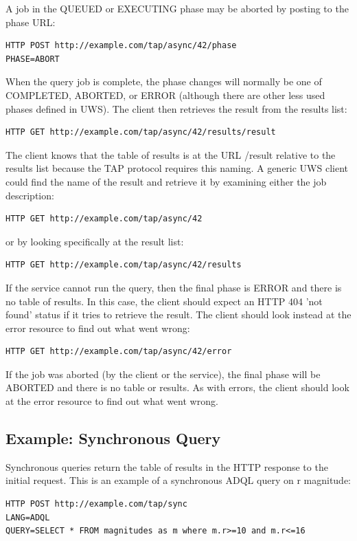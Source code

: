 \documentclass[11pt,letter]{ivoa}
\begin{document}
A job in the  QUEUED or EXECUTING phase may be aborted by posting to the phase 
URL:
\begin{verbatim}
HTTP POST http://example.com/tap/async/42/phase
PHASE=ABORT
\end{verbatim}

When the query job is complete, the phase changes will normally be one of 
COMPLETED, ABORTED, or ERROR (although there are other less used phases defined 
in UWS). The client then retrieves the result from the results list:
\begin{verbatim}
HTTP GET http://example.com/tap/async/42/results/result
\end{verbatim}
The client knows that the table of results is at the URL /result relative to the 
results list because the TAP protocol requires this naming. A generic UWS client 
could find the name of the result and retrieve it by examining either the job 
description:
\begin{verbatim}
HTTP GET http://example.com/tap/async/42
\end{verbatim}
or by looking specifically at the result list:
\begin{verbatim}
HTTP GET http://example.com/tap/async/42/results
\end{verbatim}
If the service cannot run the query, then the final phase is ERROR and there is 
no table of results. In this case, the client should expect an HTTP 404 'not 
found' status if it tries to retrieve the result. The client should look instead 
at the error resource to find out what went wrong:
\begin{verbatim}
HTTP GET http://example.com/tap/async/42/error
\end{verbatim}
If the job was aborted (by the client or the service), the final phase will be 
ABORTED and there is no table or results. As with errors, the client should look 
at the error resource to find out what went wrong.

\subsection{Example: Synchronous Query}

Synchronous queries return the table of results in the HTTP response to the 
initial request. This is an example of a synchronous ADQL query on r magnitude:

\begin{verbatim}
HTTP POST http://example.com/tap/sync
LANG=ADQL
QUERY=SELECT * FROM magnitudes as m where m.r>=10 and m.r<=16
\end{verbatim}
\end{document}
